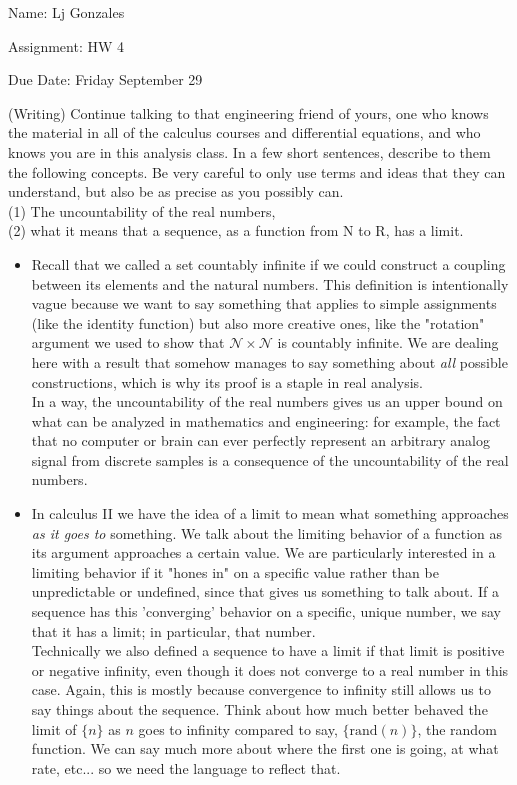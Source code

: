 \documentclass[11 pt]{article}
\begin{document}
    Name: Lj Gonzales

    Assignment: HW 4 

    Due Date: Friday September 29
    \break
\begin{problem}
(Writing) Continue talking to that engineering friend of yours, one who knows
the material in all of the calculus courses and differential equations, and who knows
you are in this analysis class. In a few short sentences, describe to them the following
concepts. Be very careful to only use terms and ideas that they can understand, but
also be as precise as you possibly can.\\
(1) The uncountability of the real numbers,\\
(2) what it means that a sequence, as a function from N to R, has a limit.
\end{problem}
\begin{solution}
\begin{itemize}
	\item Recall that we called a set countably infinite if we could construct a coupling between its elements and the natural numbers. This definition is intentionally vague because we want to say something that applies to simple assignments (like the identity function) but also more creative ones, like the "rotation" argument we used to show that $\mathcal{N}\times\mathcal{N}$ is countably infinite. We are dealing here with a result that somehow manages to say something about \emph{all} possible constructions, which is why its proof is a staple in real analysis.\\
	In a way, the uncountability of the real numbers gives us an upper bound on what can be analyzed in mathematics and engineering: for example, the fact that no computer or brain can ever perfectly represent an arbitrary analog signal from discrete samples is a consequence of the uncountability of the real numbers.
	\item In calculus II we have the idea of a limit to mean what something approaches \emph{as it goes to} something. We talk about the limiting behavior of a function as its argument approaches a certain value. We are particularly interested in a limiting behavior if it "hones in" on a specific value rather than be unpredictable or undefined, since that gives us something to talk about. If a sequence has this 'converging' behavior on a specific, unique number, we say that it has a limit; in particular, that number.\\
	Technically we also defined a sequence to have a limit if that limit is positive or negative infinity, even though it does not converge to a real number in this case. Again, this is mostly because convergence to infinity still allows us to say things about the sequence. Think about how much better behaved the limit of $\{n\}$ as $n$ goes to infinity compared to say,  $\{\text{rand}(n)\}$, the random function. We can say much more about where the first one is going, at what rate, etc... so we need the language to reflect that.
\end{itemize}
\end{solution} 
\end{document}
